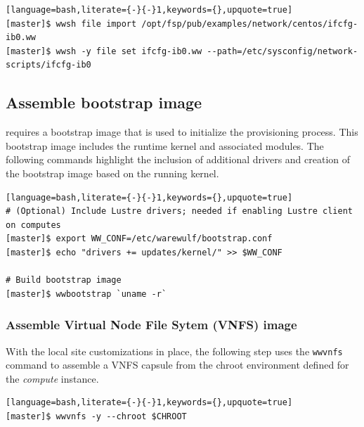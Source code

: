 \documentclass[letterpaper]{article}
\begin{document}
\begin{lstlisting}[language=bash,literate={-}{-}1,keywords={},upquote=true]
[master]$ wwsh file import /opt/fsp/pub/examples/network/centos/ifcfg-ib0.ww
[master]$ wwsh -y file set ifcfg-ib0.ww --path=/etc/sysconfig/network-scripts/ifcfg-ib0
\end{lstlisting}


\subsection{Assemble bootstrap image}

\Warewulf{} requires a bootstrap image that is used to initialize the provisioning
process. This bootstrap image includes the runtime kernel and associated
modules. The following commands highlight the inclusion of additional drivers
and creation of the bootstrap image based on the running kernel.

\begin{lstlisting}[language=bash,literate={-}{-}1,keywords={},upquote=true]
# (Optional) Include Lustre drivers; needed if enabling Lustre client on computes
[master]$ export WW_CONF=/etc/warewulf/bootstrap.conf
[master]$ echo "drivers += updates/kernel/" >> $WW_CONF

# Build bootstrap image
[master]$ wwbootstrap `uname -r`
\end{lstlisting}

\subsubsection{Assemble Virtual Node File Sytem (VNFS) image}

With the local site customizations in place, the following step uses the
\texttt{wwvnfs} command to assemble a VNFS capsule from the chroot environment
defined for the {\em compute} instance. 

\begin{lstlisting}[language=bash,literate={-}{-}1,keywords={},upquote=true]
[master]$ wwvnfs -y --chroot $CHROOT
\end{lstlisting}
\end{document}
